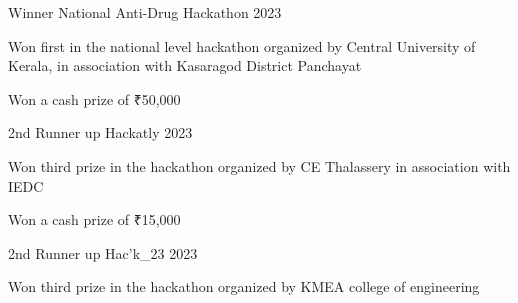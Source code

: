 
\begin{cventries}
  \cventry
    {Winner} %
    {National Anti-Drug Hackathon} %
    {}
    {2023} %
    {
      \begin{cvitems}
          \item {Won first in the national level hackathon organized by Central University of Kerala, in association with Kasaragod District Panchayat}
          \item {Won a cash prize of ₹50,000}
      \end{cvitems}
    }
  \cventry
    {2nd Runner up}
    {Hackatly}
    {}
    {2023}
    {
      \begin{cvitems}
          \item {Won third prize in the hackathon organized by CE Thalassery in association with IEDC}
          \item {Won a cash prize of ₹15,000}
      \end{cvitems}
    }
    \cventry
    {2nd Runner up}
    {Hac'k_23}
    {}
    {2023}
    {
      \begin{cvitems}
          \item {Won third prize in the hackathon organized by KMEA college of engineering}
      \end{cvitems}
    }
\end{cventries}